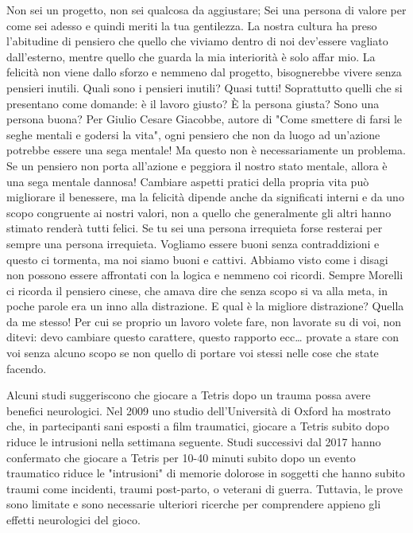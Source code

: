 \documentclass[12pt]{book} %
\begin{document}
Non sei un progetto, non sei qualcosa da aggiustare; Sei una
persona di valore per come sei adesso e quindi meriti la tua gentilezza. La nostra cultura ha preso l'abitudine di
pensiero che quello che viviamo dentro di noi dev'essere vagliato dall'esterno, mentre quello che
guarda la mia interiorità è solo affar mio. La felicità non viene dallo sforzo e nemmeno dal
progetto, bisognerebbe vivere senza pensieri inutili. Quali sono i pensieri inutili? Quasi tutti! Soprattutto quelli
che si presentano come domande: è il lavoro giusto? È la persona giusta? Sono una persona
buona? 
Per Giulio Cesare Giacobbe, autore di "Come smettere di farsi le seghe mentali e godersi la vita", ogni pensiero che non da luogo ad un'azione potrebbe essere una sega mentale! Ma questo non è necessariamente un problema. Se un pensiero non porta all'azione e peggiora il nostro stato mentale, allora è una sega mentale dannosa!
Cambiare aspetti pratici della propria vita può migliorare il benessere, ma la felicità dipende anche da significati interni e da uno scopo congruente ai nostri valori, non a quello che generalmente gli altri hanno stimato renderà tutti felici. Se tu sei una persona irrequieta forse resterai per sempre una persona irrequieta. Vogliamo
essere buoni senza contraddizioni e questo ci tormenta, ma noi siamo buoni e cattivi. Abbiamo visto come i disagi non
possono essere affrontati con la logica e nemmeno coi ricordi. 
Sempre Morelli ci ricorda il pensiero cinese, che amava dire che senza scopo si va alla meta, in poche parole era un inno alla distrazione. E qual è la migliore distrazione? Quella da me stesso! Per cui se proprio un lavoro volete fare, non lavorate su di voi, non ditevi: devo cambiare questo carattere, questo rapporto ecc… provate a stare con voi senza alcuno scopo se non quello di portare voi stessi nelle cose che state facendo. 

\begin{mdframed}[linewidth=1pt]
Alcuni studi suggeriscono che giocare a Tetris dopo un trauma possa avere benefici neurologici. Nel 2009 uno studio dell’Università di Oxford ha mostrato che, in partecipanti sani esposti a film traumatici, giocare a Tetris subito dopo riduce le intrusioni nella settimana seguente. Studi successivi dal 2017 hanno confermato che giocare a Tetris per 10-40 minuti subito dopo un evento traumatico riduce le "intrusioni" di memorie dolorose in soggetti che hanno subito traumi come incidenti, traumi post-parto, o veterani di guerra. Tuttavia, le prove sono limitate e sono necessarie ulteriori ricerche per comprendere appieno gli effetti neurologici del gioco.
\end{mdframed}
\end{document}
